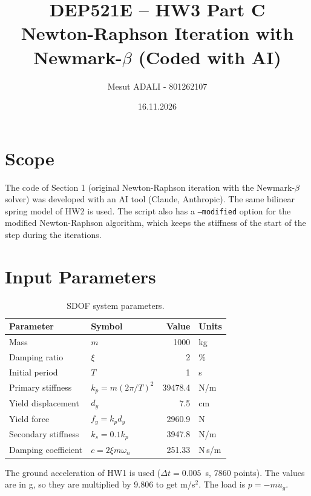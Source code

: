 \documentclass[11pt,a4paper]{article}
\title{DEP521E -- HW3 Part C\\Newton-Raphson Iteration with Newmark-$\beta$ (Coded with AI)}
\author{Mesut ADALI - 801262107}
\date{16.11.2026}
\begin{document}
\maketitle

\section{Scope}
The code of Section 1 (original Newton-Raphson iteration with the Newmark-$\beta$ solver)
was developed with an AI tool (Claude, Anthropic). The same bilinear spring model of HW2
is used. The script also has a \texttt{--modified} option for the modified Newton-Raphson
algorithm, which keeps the stiffness of the start of the step during the iterations.

\section{Input Parameters}
\begin{table}[H]
\centering
\begin{tabular}{llrl}
\hline
Parameter & Symbol & Value & Units \\
\hline
Mass                & $m$   & 1000    & kg \\
Damping ratio       & $\xi$ & 2       & \% \\
Initial period      & $T$   & 1       & s \\
Primary stiffness   & $k_p = m(2\pi/T)^2$ & 39478.4 & N/m \\
Yield displacement  & $d_y$ & 7.5     & cm \\
Yield force         & $f_y = k_p d_y$ & 2960.9 & N \\
Secondary stiffness & $k_s = 0.1k_p$  & 3947.8 & N/m \\
Damping coefficient & $c = 2\xi m\omega_n$ & 251.33 & N\,s/m \\
\hline
\end{tabular}
\caption{SDOF system parameters.}
\end{table}
The ground acceleration of HW1 is used ($\Delta t = 0.005$~s, 7860 points). The values
are in g, so they are multiplied by 9.806 to get m/s$^2$. The load is $p = -m\ddot{u}_g$.
\end{document}
